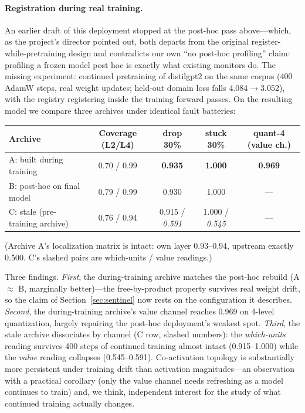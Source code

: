 \documentclass[11pt]{article}
\begin{document}
\paragraph{Registration during real training.} An earlier draft of this
deployment stopped at the post-hoc pass above---which, as the project's
director pointed out, both departs from the original
register-while-pretraining design and contradicts our own
``no post-hoc profiling'' claim: profiling a frozen model post hoc is exactly
what existing monitors do. The missing experiment: continued pretraining of
distilgpt2 on the same corpus (400 AdamW steps, real weight updates; held-out
domain loss falls 4.084$\rightarrow$3.052), with the registry registering
inside the training forward passes. On the resulting model we compare three
archives under identical fault batteries:

\begin{center}
\small
\setlength{\tabcolsep}{4pt}
\begin{tabular}{@{}lcccc@{}}
\toprule
Archive & Coverage (L2/L4) & drop 30\% & stuck 30\% & quant-4 (value ch.) \\
\midrule
A: built during training & 0.70 / 0.99 & \textbf{0.935} & \textbf{1.000} & \textbf{0.969} \\
B: post-hoc on final model & 0.79 / 0.99 & 0.930 & 1.000 & --- \\
C: stale (pre-training archive) & 0.76 / 0.94 & 0.915 / \emph{0.591} & 1.000 / \emph{0.545} & --- \\
\bottomrule
\end{tabular}
\end{center}

\noindent (Archive A's localization matrix is intact: own layer 0.93--0.94,
upstream exactly 0.500. C's slashed pairs are which-units / value readings.)

Three findings. \emph{First}, the during-training archive matches the
post-hoc rebuild (A $\approx$ B, marginally better)---the free-by-product
property survives real weight drift, so the claim of
Section~\ref{sec:sentinel} now rests on the configuration it describes.
\emph{Second}, the during-training archive's value channel reaches 0.969 on
4-level quantization, largely repairing the post-hoc deployment's weakest
spot. \emph{Third}, the stale archive dissociates by channel (C row, slashed
numbers): the \emph{which-units} reading survives 400 steps of continued
training almost intact (0.915--1.000) while the \emph{value} reading
collapses (0.545--0.591). Co-activation topology is substantially more
persistent under training drift than activation magnitudes---an observation
with a practical corollary (only the value channel needs refreshing as a
model continues to train) and, we think, independent interest for the study
of what continued training actually changes.
\end{document}
